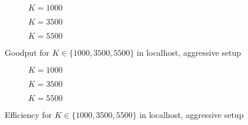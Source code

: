 \begin{figure}[t]
\centering
\begin{subfigure}{0.24\textwidth}
	\captionsetup{justification=centering,font=scriptsize}
	\centering
	\setlength\fwidth{\textwidth}
	\setlength{}
	
	\caption{$K=1000$}
	\label{fig:lh_good_1000}
\end{subfigure}\hspace{2em}%
\begin{subfigure}{0.23\textwidth}
	\captionsetup{justification=centering,font=scriptsize}
	\centering
	\setlength\fwidth{\textwidth}
	\setlength{}
	
	\caption{$K=3500$}
	\label{fig:lh_good_3500}
\end{subfigure}\hspace{2em}%
\begin{subfigure}{0.23\textwidth}
	\captionsetup{justification=centering,font=scriptsize}
	\centering
	\setlength\fwidth{\textwidth}
	\setlength{}
	
	\caption{$K=5500$}
	\label{fig:lh_good_5500}
\end{subfigure}
\caption{Goodput for $K \in \{1000, 3500, 5500\}$ in localhost, aggressive setup}
\label{fig:goodput_aggr}
\end{figure}

\begin{figure}[t]
\centering
\begin{subfigure}{0.23\textwidth}
	\captionsetup{justification=centering,font=scriptsize}
	\centering
	\setlength\fwidth{\textwidth}
	\setlength{}
	
	\caption{$K=1000$}
	\label{fig:lh_eff_1000}
\end{subfigure}\hspace{2em}%
\begin{subfigure}{0.23\textwidth}
	\captionsetup{justification=centering,font=scriptsize}
	\centering
	\setlength\fwidth{\textwidth}
	\setlength{}
	
	\caption{$K=3500$}
	\label{fig:lh_eff_3500}
\end{subfigure}\hspace{2em}%
\begin{subfigure}{0.23\textwidth}
	\captionsetup{justification=centering,font=scriptsize}
	\centering
	\setlength\fwidth{\textwidth}
	\setlength{}
	
	\caption{$K=5500$}
	\label{fig:lh_eff_5500}
\end{subfigure}
\caption{Efficiency for $K \in \{1000, 3500, 5500\}$ in localhost, aggressive setup}
\label{fig:efficiency_aggr}
\end{figure}

